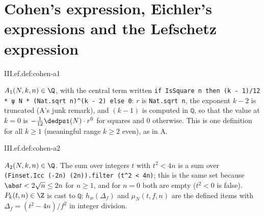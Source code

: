 \section{Cohen's expression, Eichler's expressions and the Lefschetz expression}\label{sec:ef-expressions}

\begin{definition}
\end{definition}
\begin{tfformal}{III.ef.def:cohen-a1}
\begin{tffidelity}
$A_1(N,k,n)\in\Q$, with the central term written \texttt{if IsSquare n then (k - 1)/12 * ψ N * (Nat.sqrt n)\^{}(k - 2) else 0}: $r$ is \texttt{Nat.sqrt n}, the exponent $k-2$ is truncated (A's junk remark), and $(k-1)$ is computed in \texttt{ℚ}, so that the value at $k=0$ is $-\tfrac1{12}\dedpsi(N)\cdot r^0$ for squares and $0$ otherwise. This is one definition for all $k\ge1$ (meaningful range $k\ge2$ even), as in A.
\end{tffidelity}
\end{tfformal}

\begin{definition}
\end{definition}
\begin{tfformal}{III.ef.def:cohen-a2}
\begin{tffidelity}
$A_2(N,k,n)\in\Q$. The sum over integers $t$ with $t^2<4n$ is a sum over \texttt{(Finset.Icc (-2n) (2n)).filter (t\^{}2 < 4n)}; this is the same set because $\abs t<2\sqrt n\le2n$ for $n\ge1$, and for $n=0$ both are empty ($t^2<0$ is false). $P_k(t,n)\in\Z$ is cast to \texttt{ℚ}; $h_w(\Delta_f)$ and $\mu_N(t,f,n)$ are the defined items with $\Delta_f=(t^2-4n)/f^2$ in integer division.
\end{tffidelity}
\end{tfformal}

